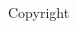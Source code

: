 \documentclass[10pt]{article}
\begin{document}
\begin{multicols}{3}



\noindent Copyright \textcopyright{} \thedate{} \theauthor{}

\end{multicols}
\end{document}
